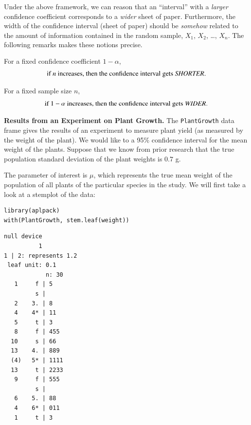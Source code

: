 \documentclass[captions=tableheading]{scrbook}
\begin{document}
Under the above framework, we can reason that an ``interval'' with a \emph{larger} confidence coefficient corresponds to a \emph{wider} sheet of paper. Furthermore, the width of the confidence interval (sheet of paper) should be \emph{somehow} related to the amount of information contained in the random sample, \(X_{1}\), \(X_{2}\), \ldots{},
\(X_{n}\). The following remarks makes these notions precise. 

\begin{rem}
For a fixed confidence coefficient \(1-\alpha\),
\begin{equation}
\mbox{if }n\mbox{ increases, then the confidence interval gets \emph{SHORTER}.}
\end{equation}
\end{rem}

\begin{rem}
For a fixed sample size \(n\),
\begin{equation}
\mbox{if }1-\alpha\mbox{ increases, then the confidence interval gets \emph{WIDER}.}
\end{equation}
\end{rem}


\begin{example}
\label{exa:plant-one-samp-z-int}
\textbf{Results from an Experiment on Plant Growth.} The \texttt{PlantGrowth} data frame gives the results of an experiment to measure plant yield (as measured by the weight of the plant). We would like to a 95\% confidence interval for the mean weight of the plants. Suppose that we know from prior research that the true population standard deviation of the plant weights is \(0.7\) g.

The parameter of interest is \(\mu\), which represents the true mean weight of the population of all plants of the particular species in the study. We will first take a look at a stemplot of the data:

\end{example}


\begin{verbatim}
library(aplpack)
with(PlantGrowth, stem.leaf(weight))
\end{verbatim}


\begin{verbatim}
null device 
          1
1 | 2: represents 1.2
 leaf unit: 0.1
            n: 30
   1     f | 5
         s | 
   2    3. | 8
   4    4* | 11
   5     t | 3
   8     f | 455
  10     s | 66
  13    4. | 889
  (4)   5* | 1111
  13     t | 2233
   9     f | 555
         s | 
   6    5. | 88
   4    6* | 011
   1     t | 3
\end{verbatim}
\end{document}
